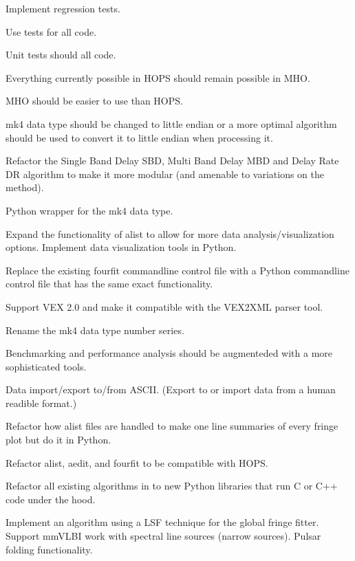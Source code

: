 \begin{description}
 Implement regression tests. \FIXME[enumerate]

 Use  tests for all code. \FIXME[enumerate]

 Unit tests should  all code. \FIXME[enumerate]

 Everything currently possible in \ac{HOPS} should remain
    possible in \ac{MHO}.

 \ac{MHO} should be easier to use than \ac{HOPS}.

 mk4 data type should be changed to little endian or a more
    optimal algorithm should be used to convert it to little endian
    when processing it.

 Refactor the Single Band Delay \ac{SBD},
    Multi Band Delay \ac{MBD} and Delay Rate \ac{DR} algorithm to
    make it more modular (and amenable to variations on the method).

 Python wrapper for the mk4 data type.

 Expand the functionality of alist to allow for more data
    analysis/visualization options.
 Implement data visualization tools in Python.

 Replace the existing fourfit commandline control file with
    a Python commandline control file that has the same exact functionality.

 Support VEX 2.0 and make it compatible with the VEX2XML parser tool.

 Rename the mk4 data type number series.

 Benchmarking and performance analysis should be augmenteded
    with a more sophisticated tools.

 Data import/export to/from ASCII. (Export to or import data
    from a human readible format.)

 Refactor how alist files are handled to make one line
    summaries of every fringe plot but do it in Python.

 Refactor alist, aedit, and fourfit to be compatible with \ac{HOPS}.

 Refactor all existing algorithms in to new Python libraries
    that run C or C++ code under the hood.

 Implement an algorithm using a \ac{LSF} %
    technique for the global fringe fitter.
 Support mmVLBI work with spectral line sources (narrow sources).
 Pulsar folding functionality.


\end{description}
